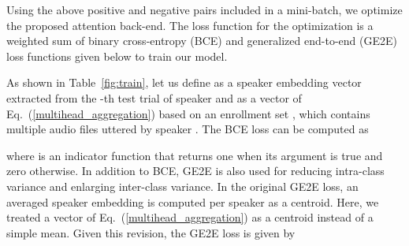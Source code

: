 \documentclass{article}
\begin{document}
Using the above positive and negative pairs included in a mini-batch, we optimize the proposed attention back-end. The loss function for the optimization is a weighted sum of binary cross-entropy (BCE) and generalized end-to-end (GE2E) loss \cite{ge2e} functions given below to train our model.


As shown in Table~\ref{fig:train}, let us define  as a speaker embedding vector extracted from the -th test trial of speaker  and  as a vector  of Eq.\ (\ref{multihead_aggregation}) based on an enrollment set , which contains multiple audio files uttered by speaker . The BCE loss can be computed as  

where  is an indicator function that returns one when its argument is true and zero otherwise. In addition to BCE, GE2E \cite{ge2e} is also used for reducing intra-class variance and enlarging inter-class variance. In the original GE2E loss, an averaged speaker embedding is computed per speaker as a centroid. Here, we treated a vector  of Eq.\ (\ref{multihead_aggregation}) as a centroid instead of a simple mean. Given this revision, the GE2E loss is given by

\vspace{-3mm}
\end{document}
